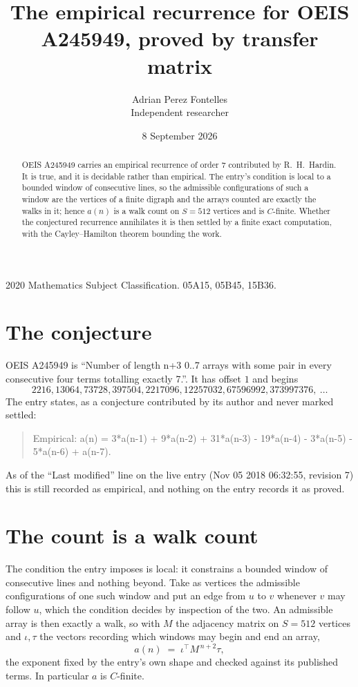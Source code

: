 \documentclass[11pt,a4paper]{article}
\title{The empirical recurrence for OEIS A245949, proved by transfer matrix}
\author{Adrian Perez Fontelles\\ \small Independent researcher}
\date{8 September 2026}
\theoremstyle{plain}
\theoremstyle{definition}
\begin{document}
\maketitle

\begin{abstract}
OEIS A245949 carries an empirical recurrence of order $7$ contributed by R.~H.~Hardin. It is
true, and it is decidable rather than empirical. The entry's condition is local to a bounded window of consecutive lines, so
the admissible configurations of such a window are the vertices of a finite digraph and the
arrays counted are exactly the walks in it; hence $a(n)$ is a walk count on $S=512$ vertices
and is $C$-finite. Whether the conjectured recurrence annihilates it is then settled by a
finite exact computation, with the Cayley--Hamilton theorem bounding the work.
\end{abstract}

\noindent\small 2020 Mathematics Subject Classification. 05A15, 05B45, 15B36.\normalsize

\section{The conjecture}

OEIS A245949 is ``Number of length n+3 0..7 arrays with some pair in every consecutive four terms totalling exactly 7.''. It has offset $1$ and begins
\[
2216, 13064, 73728, 397504, 2217096, 12257032, 67596992, 373997376,\ \dots
\]
The entry states, as a conjecture contributed by its author and never marked settled:
\begin{quote}
Empirical: a(n) = 3*a(n-1) + 9*a(n-2) + 31*a(n-3) - 19*a(n-4) - 3*a(n-5) - 5*a(n-6) + a(n-7).
\end{quote}
As of the ``Last modified'' line on the live entry (Nov 05 2018 06:32:55, revision 7) this is still
recorded as empirical, and nothing on the entry records it as proved.

\section{The count is a walk count}

The condition the entry imposes is local: it constrains a bounded window of consecutive lines and nothing beyond. Take as
vertices the admissible configurations of one such window and put an edge from $u$ to $v$
whenever $v$ may follow $u$, which the condition decides by inspection of the two. An
admissible array is then exactly a walk, so with $M$ the adjacency matrix on $S=512$ vertices
and $\iota,\tau$ the vectors recording which windows may begin and end an array,
\[
a(n)\;=\;\iota^{\!\top}M^{\,n+2}\tau ,
\]
the exponent fixed by the entry's own shape and checked against its published terms. In
particular $a$ is $C$-finite.
\end{document}
